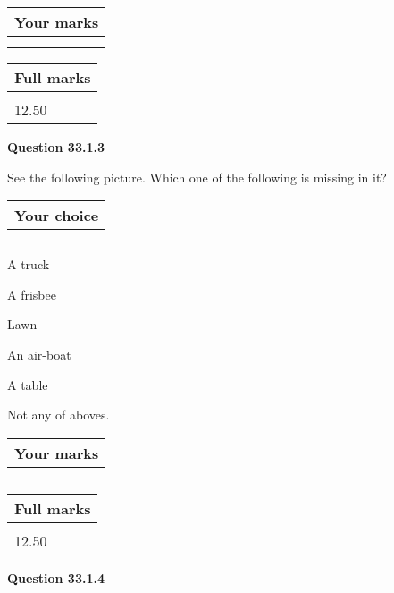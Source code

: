 \documentclass[12pt]{article}
\begin{document}
 

 
 

 
\vspace{0.3in}
  
\vspace{0.2in}
  
         \begin{tabular}{|l|}
\hline
 Your marks  \\
\hline
 \\ 
 \\ 
\hline
\end{tabular}
\hspace{0.05in} \begin{tabular}{|l|}
\hline
 Full marks  \\
\hline
 \\ 
12.50 \\
\hline
\end{tabular}
{\textbf{\Large{Question
33.1.3 
}}}
  
  
See the following picture.
Which one of the following is missing in it?
  
  
\noindent\hspace{3.0in} \begin{tabular}{|l|}
\hline
Your choice \\
\hline
 \\ 
 \\ 
\hline
\end{tabular}
  
  
 
 
A truck
 
 
A frisbee
 
 
Lawn
 
 
An air-boat
 
 
A table
 
 
  Not any of aboves.
 
 
 
\vspace{0.3in}
  
\vspace{0.2in}
  
         \begin{tabular}{|l|}
\hline
 Your marks  \\
\hline
 \\ 
 \\ 
\hline
\end{tabular}
\hspace{0.05in} \begin{tabular}{|l|}
\hline
 Full marks  \\
\hline
 \\ 
12.50 \\
\hline
\end{tabular}
{\textbf{\Large{Question
33.1.4 
}}}
  
\end{document}
